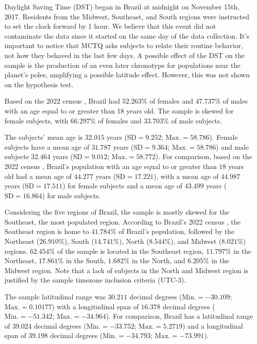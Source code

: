 \documentclass[
12pt,
openright,
oneside,
a4paper,
chapter=TITLE,
section=TITLE,
french,
spanish,
brazil,
english
]{abntex2}\usepackage{array}
\begin{document}
Daylight Saving Time (DST) began in Brazil at midnight on November 15th,
2017. Residents from the Midwest, Southeast, and South regions were
instructed to set the clock forward by 1 hour. We believe that this
event did not contaminate the data since it started on the same day of
the data collection. It's important to notice that MCTQ asks subjects to
relate their routine behavior, not how they behaved in the last few
days. A possible effect of the DST on the sample is the production of an
even later chronotype for populations near the planet's poles,
amplifying a possible latitude effect. However, this was not shown on
the hypothesis test.

Based on the 2022 census \autocite{ibgea}, Brazil had \(52.263\%\) of
females and \(47.737\%\) of males with an age equal to or greater than
18 years old. The sample is skewed for female subjects, with
\(66.297\%\) of females and \(33.703\%\) of male subjects.

The subjects' mean age is \(32.015\) years (\(\text{SD} = 9.252\);
\(\text{Max.} = 58.786\)). Female subjects have a mean age of \(31.787\)
years (\(\text{SD} = 9.364\); \(\text{Max.} = 58.786\)) and male
subjects \(32.464\) years (\(\text{SD} = 9.012\);
\(\text{Max.} = 58.772\)). For comparison, based on the 2022 census
\autocite{ibgeb}, Brazil's population with an age equal to or greater
than \(18\) years old had a mean age of \(44.277\) years
(\(\text{SD} = 17.221\)), with a mean age of \(44.987\) years
(\(\text{SD} = 17.511\)) for female subjects and a mean age of
\(43.499\) years (\(\text{SD} = 16.864\)) for male subjects.

Considering the five regions of Brazil, the sample is mostly skewed for
the Southeast, the most populated region. According to Brazil's 2022
census \autocite{ibge2022}, the Southeast region is home to \(41.784\%\)
of Brazil's population, followed by the Northeast (\(26.910\%\)), South
(\(14.741\%\)), North (\(8.544\%\)), and Midwest (\(8.021\%\)) regions.
\(62.454\%\) of the sample is located in the Southeast region,
\(11.797\%\) in the Northeast, \(17.861\%\) in the South, \(1.682\%\) in
the North, and \(6.205\%\) in the Midwest region. Note that a lack of
subjects in the North and Midwest region is justified by the sample
timezone inclusion criteria (UTC-3).

The sample latitudinal range was \(30.211\) decimal degrees
(\(\text{Min.} = -30.109\); \(\text{Max.} = 0.10177\)) with a
longitudinal span of \(16.378\) decimal degrees
(\(\text{Min.} = -51.342\); \(\text{Max.} = -34.964\)). For comparison,
Brazil has a latitudinal range of \(39.024\) decimal degrees
(\(\text{Min.} = -33.752\); \(\text{Max.} = 5.2719\)) and a longitudinal
span of \(39.198\) decimal degrees (\(\text{Min.} = -34.793\);
\(\text{Max.} = -73.991\)).
\end{document}
